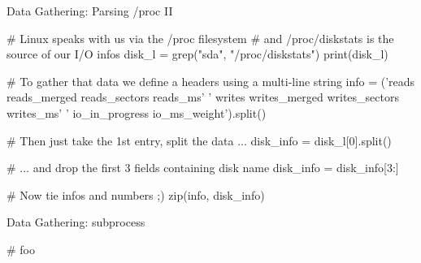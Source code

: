 \begin{frame}[fragile]{Data Gathering: Parsing /proc II}
\begin{pythoncode}
# Linux speaks with us via the /proc filesystem
#  and /proc/diskstats is the source of our I/O infos
disk_l = grep("sda", "/proc/diskstats")
print(disk_l)

# To gather that data we define a headers using a multi-line string
info = ('reads reads_merged reads_sectors reads_ms'
        ' writes writes_merged writes_sectors writes_ms'
        ' io_in_progress io_ms_weight').split()

# Then just take the 1st entry, split the data ...
disk_info = disk_l[0].split()

# ... and drop the first 3 fields containing disk name
disk_info = disk_info[3:]

# Now tie infos and numbers ;)
zip(info, disk_info)
\end{pythoncode}
\end{frame}



\begin{frame}[fragile]{Data Gathering: subprocess}
\begin{pythoncode}
# foo
\end{pythoncode}
\end{frame}

